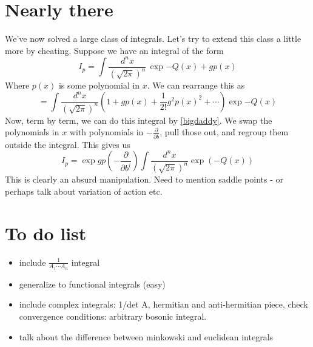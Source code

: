 \documentclass{book}
\begin{document}
\section{Nearly there}
We've now solved a large class of integrals. Let's try to extend this class a little more by cheating. Suppose we have an integral of the form 
\[
I_p = \int \frac{d^n x}{(\sqrt{2\pi})^n} \, \exp{-Q(x) + g p(x)}
\]
Where $p(x)$ is some polynomial in $x$. We can rearrange this as 
\[
= \int \frac{d^n x}{(\sqrt{2\pi})^n} \left(
1 + g p(x) + \frac{1}{2!}g^2 p(x)^2 + \cdots 
\right) \exp{-Q(x)}
\]
Now, term by term, we can do this integral by \ref{bigdaddy}. We swap the polynomials in $x$ with polynomials in $-\frac{\partial}{\partial b}$, pull those out, and regroup them outside the integral. This gives us
\[
I_p = \exp{g p \left( -\frac{\partial}{\partial b^i} \right)} \int \frac{d^n x}{(\sqrt{2\pi})^n}\exp (-Q(x))
\]
This is clearly an absurd manipulation. Need to mention saddle points - or perhaps talk about variation of action etc.

\section{To do list} 
\begin{itemize}
\item include $\frac{1}{A_1 \cdots A_n}$ integral
\item generalize to functional integrals (easy)
\item include complex integrals: 1/det A, hermitian and anti-hermitian piece, check convergence conditions: arbitrary bosonic integral.
\item talk about the difference between minkowski and euclidean integrals
\end{itemize}
\end{document}
